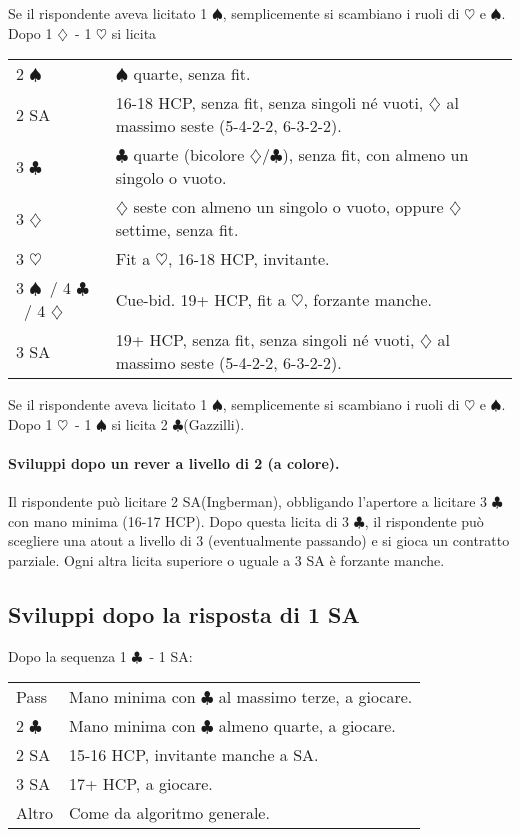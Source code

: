 \documentclass[a4paper,10pt]{article}
\renewcommand{\c}{$\clubsuit$\xspace}
\renewcommand{\d}{$\diamondsuit$\xspace}
\newcommand{\h}{$\heartsuit$\xspace}
\newcommand{\s}{$\spadesuit$\xspace}
\newcommand{\sa}{SA\xspace}
\newcommand{\smallspace}{\vskip0.3cm}
\newenvironment{twocol}
  {\smallspace\noindent\begin{tabular}{l p{0.78\textwidth}}}
  {\end{tabular}\smallspace}
\begin{document}
\noindent Se il rispondente aveva licitato 1 \s, semplicemente si scambiano i ruoli di \h e \s.
\smallspace
\noindent Dopo 1 \d\ - 1 \h si licita
\begin{twocol}
	2 \s & \s quarte, senza fit.\\
	2 \sa & 16-18 HCP, senza fit, senza singoli né vuoti, \d al massimo seste (5-4-2-2, 6-3-2-2).\\
	3 \c & \c quarte (bicolore \d/\c), senza fit, con almeno un singolo o vuoto.\\
	3 \d & \d seste con almeno un singolo o vuoto, oppure \d settime, senza fit.\\
	3 \h & Fit a \h, 16-18 HCP, invitante.\\
	3 \s\ / 4 \c\ / 4 \d & Cue-bid. 19+ HCP, fit a \h, forzante manche.\\
	3 \sa & 19+ HCP, senza fit, senza singoli né vuoti, \d al massimo seste (5-4-2-2, 6-3-2-2).
\end{twocol}

\noindent Se il rispondente aveva licitato 1 \s, semplicemente si scambiano i ruoli di \h e \s.
\smallspace
\noindent Dopo 1 \h\ - 1 \s si licita 2 \c (Gazzilli).

\paragraph{Sviluppi dopo un rever a livello di 2 (a colore).} Il rispondente può licitare 2 \sa (Ingberman), obbligando l'apertore a licitare 3 \c con mano minima (16-17 HCP). Dopo questa licita di 3 \c, il rispondente può scegliere una atout a livello di 3 (eventualmente passando) e si gioca un contratto parziale. Ogni altra licita superiore o uguale a 3 \sa è forzante manche.

\subsection{Sviluppi dopo la risposta di 1 \sa}

\color{red}
\noindent Dopo la sequenza 1 \c\ - 1 \sa:
\begin{twocol}
	Pass & Mano minima con \c al massimo terze, a giocare. \\
	2 \c & Mano minima con \c almeno quarte, a giocare. \\
	2 \sa & 15-16 HCP, invitante manche a \sa.\\
	3 \sa & 17+ HCP, a giocare.\\
	Altro & Come da algoritmo generale.
\end{twocol}
\end{document}
